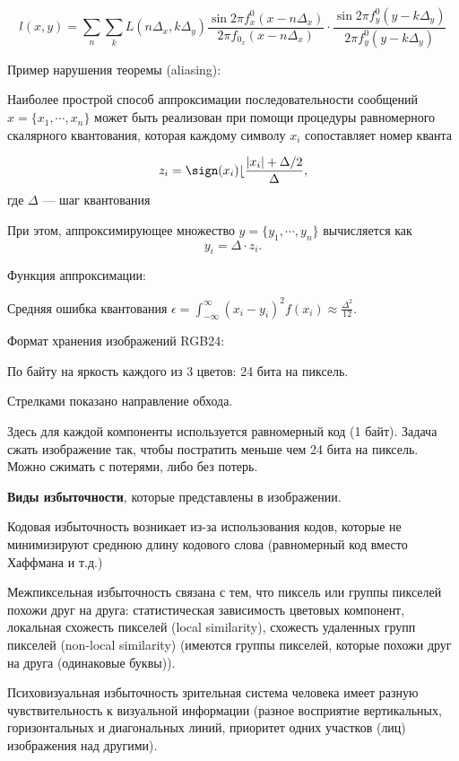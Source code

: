 {\[
    l(x, y) = \sum_n \sum_k L(n\Delta_x, k\Delta_y) \frac{\sin 2\pi f^0_x(x - n
    \Delta_x)}{2\pi f_0_x (x - n \Delta_x)} \cdot \frac{\sin 2 \pi f_y^0(y - k
\Delta_y)}{2\pi f_y^0(y - k \Delta_y)}
\]

Пример нарушения теоремы (aliasing):


Наиболее прострой способ аппроксимации последовательности сообщений $x = \{x_1,
\cdots, x_n\}$ может быть реализован при помощи процедуры равномерного
скалярного квантования, которая каждому символу $x_i$ сопоставляет номер кванта

\[
    z_i = \sign(x_i) \lfloor \frac{|x_i| + \Delta / 2}{\Delta},
\] где $\Delta$ --- шаг квантования

При этом, аппроксимирующее множество $y = \{y_1, \cdots, y_n\}$ вычисляется как
\[
    y_i = \Delta \cdot z_i.
\]

Функция аппроксимации:


Средняя ошибка квантования $\epsilon = \int_{-\infty}^{\infty} (x_i -
y_i)^2f(x_i) \approx \frac{\Delta^2}{12}$.

Формат хранения изображений RGB24:


По байту на яркость каждого из 3 цветов: 24 бита на пиксель.

Стрелками показано направление обхода.

Здесь для каждой компоненты используется равномерный код (1 байт). Задача сжать
изображение так, чтобы постратить меньше чем 24 бита на пиксель. Можно сжимать
с потерями, либо без потерь. 

\textbf{Виды избыточности}, которые представлены в изображении.

Кодовая избыточность возникает из-за использования кодов, которые не
минимизируют среднюю длину кодового слова (равномерный код вместо Хаффмана и
т.д.)

Межпиксельная избыточность связана с тем, что пиксель или группы пикселей
похожи друг на друга: статистическая зависимость цветовых компонент, локальная
схожесть пикселей (local similarity), схожесть удаленных групп пикселей
(non-local similarity) (имеются группы пикселей, которые похожи друг на друга
(одинаковые буквы)).

Психовизуальная избыточность зрительная система человека имеет разную
чувствительность к визуальной информации (разное восприятие вертикальных,
горизонтальных и диагональных линий, приоритет одних участков (лиц) изображения
над другими).

}
